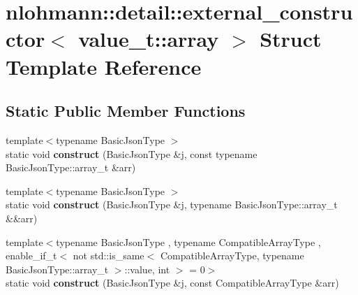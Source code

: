 \hypertarget{structnlohmann_1_1detail_1_1external__constructor_3_01value__t_1_1array_01_4}{}\section{nlohmann\+:\+:detail\+:\+:external\+\_\+constructor$<$ value\+\_\+t\+:\+:array $>$ Struct Template Reference}
\label{structnlohmann_1_1detail_1_1external__constructor_3_01value__t_1_1array_01_4}
\subsection*{Static Public Member Functions}
\begin{DoxyCompactItemize}
\item 
\mbox{\label{structnlohmann_1_1detail_1_1external__constructor_3_01value__t_1_1array_01_4_abfb2a6eec0bc21e8a7438546aebc55d8}} 
{\footnotesize template$<$typename Basic\+Json\+Type $>$ }\\static void {\bfseries construct} (Basic\+Json\+Type \&j, const typename Basic\+Json\+Type\+::array\+\_\+t \&arr)
\item 
\mbox{\label{structnlohmann_1_1detail_1_1external__constructor_3_01value__t_1_1array_01_4_a50474d6624957a630a1d398cac1e7bfa}} 
{\footnotesize template$<$typename Basic\+Json\+Type $>$ }\\static void {\bfseries construct} (Basic\+Json\+Type \&j, typename Basic\+Json\+Type\+::array\+\_\+t \&\&arr)
\item 
\mbox{\label{structnlohmann_1_1detail_1_1external__constructor_3_01value__t_1_1array_01_4_a110f50fd5378da876d9a6d6a8d945e37}} 
{\footnotesize template$<$typename Basic\+Json\+Type , typename Compatible\+Array\+Type , enable\+\_\+if\+\_\+t$<$ not std\+::is\+\_\+same$<$ Compatible\+Array\+Type, typename Basic\+Json\+Type\+::array\+\_\+t $>$\+::value, int $>$  = 0$>$ }\\static void {\bfseries construct} (Basic\+Json\+Type \&j, const Compatible\+Array\+Type \&arr)
\item 

\end{DoxyCompactItemize}
